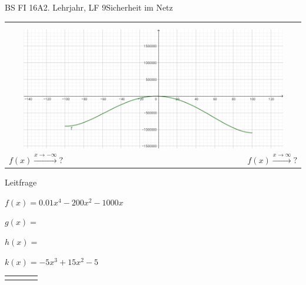 \documentclass[oneside,openany,headings=optiontotoc,11pt,numbers=noenddot]{scrreprt}
\begin{document}
	\begin{worksheet}{BS FI 16A}{2. Lehrjahr, LF 9}{Sicherheit im Netz}
		
		\noindent
		\begin{framed}
			\begin{tabular}{lcr}
				\multicolumn{3}{c}{\fbox{\(f(x) = 0.01x^{4} - 200x^{2} - 1000x\)}}\\
				& & \\
				\multicolumn{3}{c}{\includegraphics[width=0.9\textwidth]{f(x).png}}\\
				\(f(x) \xrightarrow{x \rightarrow -\infty} \text{?}\) & & \(f(x) \xrightarrow{x \rightarrow \infty} \text{?}\)
			\end{tabular}
		\end{framed}

		\setlength{\fboxsep}{1mm}
		\begin{framed}
			\tiny{\color{codegray}Leitfrage}
			\par
			\bigskip
		\end{framed}
	
		\begin{framed}
			\(f(x) = 0.01x^{4} - 200x^{2} - 1000x\)
			\par
			\bigskip
			\(g(x) = \)
			\par
			\bigskip
			\(h(x) = \)
			\par
			\bigskip
			\(k(x) = -5x^{3} + 15x^{2} - 5\)
		\end{framed}
		
		\begin{framed}
			\begin{tabular}{|lr|c|r|}
				\hline
				\diagbox{\(a_{n}\)}{n}\makebox[0.4\textwidth]{}\makebox[0.4\textwidth]{}
				\hline
				 & & & \\
				\hline
				& & & \\
				\hline
			\end{tabular}
		\end{framed}
		
	\end{worksheet}
\end{document}
